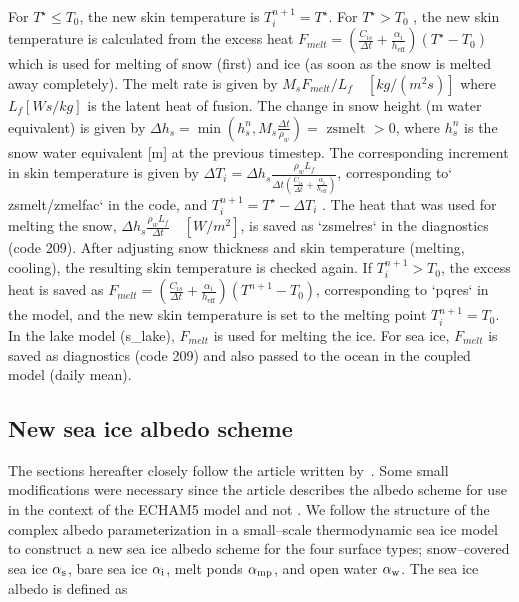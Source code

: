 For $T^{\star}\leq  T_0$, the new skin temperature is $T_i^{n+1}=T^{\star}$.
For $T^{\star}> T_0$ , the new skin temperature is calculated from the excess heat
$F_{melt}=\left ( \frac{C_{is}} {\Delta t}+\frac{\alpha_i}{h_{\text{eff}}} \right )  \left (T^{\star}-T_0 \right )$
which is used for melting of snow (first) and ice (as soon as the snow is melted away completely). The melt rate is given by $M_s  F_{melt} /L_f \quad [kg/(m^2s) ]$ where
$L_f [Ws/kg]$ is the latent heat of fusion. The change in snow height (m water equivalent) is
given by $\Delta h_s=\min{\left (h_s^n, M_s \frac{\Delta t}{\rho_w} \right )}= \text{ zsmelt } > 0$, where
$h_s^n$ is the snow water equivalent [m] at the previous timestep. The corresponding increment in skin temperature is given by
$\Delta T_i=\Delta h_s \frac{\rho_w L_f}{\Delta t \left ( \frac{C_{is}} {\Delta t}+\frac{\alpha_i}{h_{\text{eff}}} \right ) }$, corresponding to` zsmelt/zmelfac` in the code, and $T_i^{n+1}=T^{\star}-\Delta T_i$ .
The heat that was used for melting the snow, $\Delta h_s \frac{\rho_w L_f} {\Delta t} \quad [W/m^2]$, is saved as `zsmelres` in the diagnostics (code 209).
After adjusting snow thickness and skin temperature (melting, cooling), the resulting skin temperature is checked again. If $T_i^{n+1}>T_0$, the excess heat is saved as
$F_{melt}=\left ( \frac{C_{is}} {\Delta t}+\frac{\alpha_i}{h_{\text{eff}}} \right )  \left (T^{n+1}-T_0 \right )$, corresponding to `pqres` in the model, and the new skin
temperature is set to the melting point $T_i^{n+1}=T_0$.  In the lake model (s\_lake), $F_{melt}$ is used for
melting the ice. For sea ice, $F_{melt}$ is saved as diagnostics (code 209) and also passed to the
ocean in the coupled model (daily mean).

\subsection{New sea ice albedo scheme}

The sections hereafter closely follow the article written
by~\cite{pedersen2009}. Some small modifications were necessary since the
article describes the albedo scheme for use in the context of the
ECHAM5 model and not \echam.
We follow the structure of the complex albedo parameterization in a
small--scale thermodynamic sea ice model to construct a new sea ice
albedo scheme for the four surface types; snow--covered sea ice
$\alpha_{\rm s}$, bare sea ice $\alpha_{\rm i}$, melt ponds
$\alpha_{\rm mp}$, and open water $\alpha_{\rm w}$. 
The sea ice albedo is defined as


